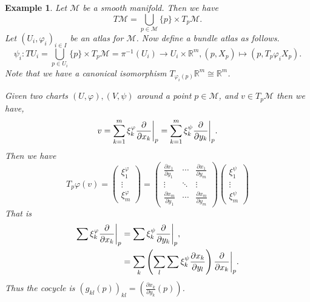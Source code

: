 \documentclass[10pt]{article}
\newtheorem{example}{Example}[section]
\newcommand{\R}[0]{\mathbb{R}}
\newcommand{\M}[0]{\mathcal{M}}
\newcommand{\pd}[2]{{\frac {\partial #1} {\partial #2}}}
\begin{document}
  \begin{example}
    Let $\M$ be a smooth manifold. Then we have 
    \begin{equation*}
      T\M = \bigcup_{p\in\M}\{p\}\times T_p\M.
    \end{equation*}
    Let $(U_i,\varphi_i)_{i\in I}$ be an atlas for $\M$. Now define a bundle atlas as follows.
    \begin{equation*}
      \psi_i:TU_i = \bigcup_{p\in U_i}\{p\}\times T_p\M  = \pi^{-1}(U_i)\to U_i\times \R^m, (p,X_p)\mapsto (p,T_p\varphi_iX_p).
    \end{equation*}
    Note that we have a canonical isomorphism $T_{\varphi_i(p)}\R^m\cong\R^m$.
    \par Given two charts $(U,\varphi),(V,\psi)$ around a point $p\in \M$, and $v\in T_p\M$ then we have,
    \begin{equation*}
      v = \sum_{k=1}^m \xi_k^\varphi \pd{}{x_k}\bigg{|}_p = \sum_{k=1}^m \xi_k^\psi \pd{}{y_k}\bigg{|}_p.
    \end{equation*}
    Then we have 
    \begin{equation*}
      T_p\varphi(v) = \begin{pmatrix}
        \xi_1^\varphi\\
        \vdots\\
        \xi_m^\varphi
      \end{pmatrix} = 
      \begin{pmatrix}
        \pd{x_1}{y_1} & \cdots & \pd{x_1}{y_m}\\
        \vdots & \ddots & \vdots \\
        \pd{x_m}{y_1}  & \cdots & \pd{x_m}{y_m}
      \end{pmatrix}
      \begin{pmatrix}
        \xi_1^\psi\\
        \vdots\\
        \xi_m^\psi
      \end{pmatrix}
    \end{equation*}
    That is 
    \begin{align*}
      \sum\xi_k^\varphi\pd{}{x_k}\bigg{|}_p & = \sum\xi_k^\psi\pd{}{y_k}\bigg{|}_p,\\
      & = \sum_k\left(\sum_l \sum\xi_k^\psi\pd{x_k}{y_l}\right)\pd{}{x_k}\bigg{|}_p.
    \end{align*}
    Thus the cocycle is $(g_{kl}(p))_{kl} = \left(\pd{x_k}{y_k}(p)\right)$.
  \end{example}
\end{document}

